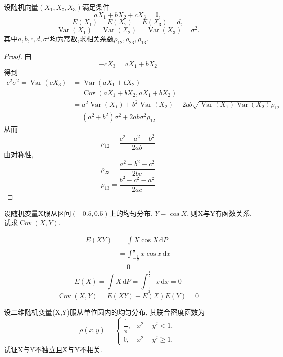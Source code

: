 \documentclass[../main.tex]{subfiles}
\begin{document}
\begin{exercise}{}{}
设随机向量\((X_1,X_2,X_3)\)满足条件
\[
aX_1+bX_2+cX_3=0,
\]
\[
E(X_1)=E(X_2)=E(X_3)=d,
\]
\[
\operatorname{Var}(X_1)=\operatorname{Var}(X_2)=\operatorname{Var}(X_3)=\sigma^2.
\]
其中\(a,b,c,d,\sigma^2\)均为常数,求相关系数\(\rho_{12},\rho_{23},\rho_{13}\).
\end{exercise}
\begin{proof}
  由 \[
  -cX_3= aX_1+ bX_2
  \]得到
\[
\begin{aligned}
c^{2} \sigma ^{2}= \operatorname{Var}\left( cX_3 \right)&= \operatorname{Var}\left( aX_1+ bX_2 \right)\\ 
 &= \operatorname{Cov}\left( aX_1+ bX_2,aX_1+ bX_2 \right)\\ 
  &= a^{2}\operatorname{Var}\left( X_1 \right)+ b^{2}\operatorname{Var}\left( X_2 \right)+ 2ab \sqrt{\operatorname{Var}\left( X_1 \right)\operatorname{Var}\left( X_2 \right)  }\rho _{12}  \\ 
   &= \left( a^{2}+ b^{2} \right) \sigma ^{2}+ 2ab  \sigma ^{2}\rho _{12} 
\end{aligned}  
\]从而\[
\rho _{12}= \frac{ c^{2}-a^{2}-b^{2}   }{2ab } 
\]由对称性, \[
\rho _{23}= \frac{ a^{2}-b^{2}-c^{2}   }{2bc } 
\] \[
\rho _{13}= \frac{ b^{2}-c^{2}-a^{2} }{2ac } 
\]
\end{proof}
\begin{exercise}{}{}
设随机变量X服从区间\((-0.5,0.5)\)上的均匀分布, \(Y = \cos X\), 则X与Y有函数关系. 试求\(\operatorname{Cov}(X,Y)\).
\end{exercise}

\begin{solution}
  \[
  \begin{aligned}
  E\left( XY \right)&= \int X\cos X\,\mathrm{d} P\\ 
   &=  \int _{-\frac{1}{2}}^{\frac{1}{2}} x\cos x\,\mathrm{d} x\\ 
    &= 0 
  \end{aligned} 
  \] \[
  E\left( X \right)= \int X\,\mathrm{d} P= \int _{-\frac{1}{2}}^{\frac{1}{2}}x\,\mathrm{d} x= 0 
  \] \[
  \operatorname{Cov}\left( X,Y \right)= E\left( XY \right)-E\left( X \right)E\left( Y \right)= 0    
  \]
\end{solution}

\begin{exercise}{}{}
设二维随机变量(X,Y)服从单位圆内的均匀分布, 其联合密度函数为
\[
\rho(x,y)=
\begin{cases}
\dfrac{1}{\pi}, & x^{2}+y^{2}<1,\\[4pt]
0, & x^{2}+y^{2}\ge1.
\end{cases}
\]
试证X与Y不独立且X与Y不相关.
\end{exercise}
\end{document}
